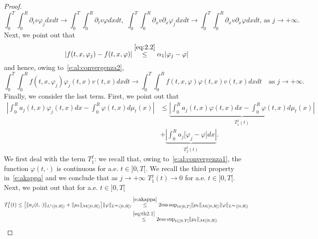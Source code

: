 \documentclass[11pt,leqno]{amsart}
\numberwithin{equation}{section}
\begin{document}
\begin{proof}
\begin{equation}
  \label{e:primotermine}
  \int_0^T \! \!  \int_0^R \!\!
  {\partial_t} v {\varphi}_j dx dt \to \!\! 
  \int_0^T \! \!  \int_0^R \!\!
  {\partial_t} v {\varphi} dx dt, \,\,
  \int_0^T \! \!  \int_0^R \!\!
  {\partial_x } v  {\partial_x } {\varphi}_j dx dt \to \!\! 
  \int_0^T \! \!  \int_0^R \!\!
  {\partial_x } v  {\partial_x } {\varphi} dx dt, 
  \, \text{as $j \to + \infty$. }
\end{equation}
Next, we point out that
$$
 |f(t, x, {\varphi}_j) - f(t, x, {\varphi})| \stackrel{\eqref{eq:2.2}}{\leq} 
    \alpha_1 |{\varphi}_j - {\varphi}| 
$$
and hence, owing to~\eqref{e:al:convergenza2}, 
\begin{equation}
\label{e:secondotermine}
   \int_0^T \! \!  \int_0^R
 f(t, x, {\varphi}_j) {\varphi}_j (t, x) v(t, x) dx dt \to 
  \int_0^T \! \!  \int_0^R
  f(t, x, {\varphi}) {\varphi} (t, x) v(t, x)
   dx dt
  \quad \text{as $j \to + \infty$. }
\end{equation}
Finally, we consider the last term. First, we point out that 
\begin{equation}
\label{e:al:ultimo}
\begin{split}
    \left| \int_0^R 
    a_j (t, x) {\varphi}_j  (t, x)dx 
    - \int_0^R  {\varphi}(t, x) d \mu_t (x)
    \right| & \leq 
    \underbrace{\left| \int_0^R 
    a_j (t, x) {\varphi} (t, x) dx
    - \int_0^R  {\varphi}(t, x) d \mu_t (x)
    \right|}_{T^j_1(t)} \\
    & +
    \underbrace{\left| \int_0^R 
    a_j \big[ {\varphi}_j  - {\varphi} \big] dx 
    \right| }_{T^j_2(t)}.
\end{split}
\end{equation}
We first deal with the term $T^j_1$: we recall that, owing to~\eqref{e:al:convergenza1}, the function ${\varphi}(t, \cdot)$ is continuous for a.e. $t \in ]0, T[$. We recall the third property in~\eqref{e:akappa} and we conclude that as $j \to + \infty$ $T^j_1 (t) \to 0$ for a.e. $t \in ]0, T[$. Next, we point out that for a.e. $t \in ]0, T[$
\begin{equation*}
\begin{split}
   T^j_1 (t) \leq 
   \big[ \| a_j (t, \cdot) \|_{L^1 (]0, R[)} + \| \mu_t \|_{\mathcal M(]0, R[)}
    \big] \| {\varphi} \|_{L^\infty (]0, R[)} 
   & \stackrel{\eqref{e:akappa}}{\leq} 
    2 \mathrm{ess \, sup}_{t \in ]0, T[} 
     \| \mu_t \|_{\mathcal M(]0, R[)} \| {\varphi} \|_{L^\infty (]0, R[)}\\
     &
    \stackrel{\eqref{eq:th2.1}}{\leq} 
    2 \mathrm{ess \, sup}_{t \in ]0, T[} \| \mu_t \|_{\mathcal M(]0, R[)} 

\end{split}
\end{equation*}
\end{proof}
\end{document}
